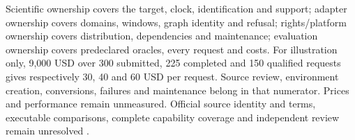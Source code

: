 Scientific ownership covers the target, clock, identification and support;
adapter ownership covers domains, windows, graph identity and refusal;
rights/platform ownership covers distribution, dependencies and maintenance;
evaluation ownership covers predeclared oracles, every request and costs.
For illustration only, 9,000 USD over 300 submitted, 225 completed and
150 qualified requests gives respectively 30, 40 and 60 USD per request.
Source review, environment creation, conversions, failures and maintenance
belong in that numerator. Prices and performance remain unmeasured.
Official source identity and terms, executable comparisons, complete capability coverage and independent review remain unresolved
\citep{exec24_banjo_choice}.
